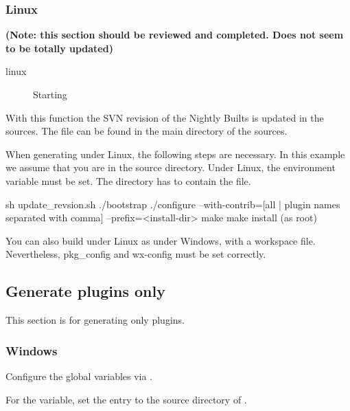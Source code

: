\subsubsection{Linux}

\textbf{(Note: this section should be reviewed and completed. Does not seem to be totally updated)}

\begin{description}
\item[linux] Starting 
\end{description}

With this function the SVN revision of the Nightly Builts is updated in the sources. The file can be found in the main directory of the \codeblocks sources.

When generating under Linux, the following steps are necessary. In this example we assume that you are in the \codeblocks source directory.  Under Linux, the environment variable  must be set. The  directory has to contain the  file.



\begin{cmd}
sh update_revsion.sh
./bootstrap
./configure --with-contrib=[all | plugin names separated with comma]
     --prefix=<install-dir>
make
make install (as root)
\end{cmd}

You can also build under Linux as under Windows, with a workspace file. Nevertheless, pkg\_config and wx-config must be set correctly.

\subsection{Generate plugins only}

This section is for generating only plugins.

\subsubsection{Windows}

Configure the global variables via .


For the  variable, set the  entry to the source directory of \codeblocks.

